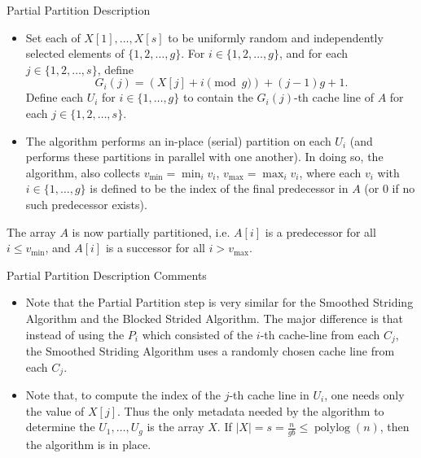 \documentclass{beamer}
\begin{document}
\begin{frame}[t]{Partial Partition Description}
	\begin{itemize}
\item Set each of $X[1], \ldots, X[s]$ to be uniformly random and
  independently selected elements of $\{1, 2, \ldots, g\}$. For
  $i \in \{1, 2, \ldots, g\}$, and for each $j \in \{1, 2,
  \ldots, s\}$, define
  $$G_i(j) = (X[j] + i \pmod g) + (j - 1)g + 1.$$ 
	Define each $U_i$ for $i \in \{1, \ldots, g\}$ to contain the $G_i(j)$-th cache line of $A$ for each $j \in \{1, 2,
  \ldots, s\}$. 

\item The algorithm performs an in-place (serial) partition on each
  $U_i$ (and performs these partitions in parallel with one
  another). In doing so, the algorithm, also collects
  $v_{\text{min}}=\min_i{v_i}$, $v_{\text{max}}=\max_i{v_i}$, where
	each $v_i$ with $i \in \{1, \ldots, g\}$ is defined to be the index
  of the final predecessor in $A$ (or $0$ if no such predecessor
  exists).
\end{itemize}
The array $A$ is now partially partitioned, i.e. $A[i]$ is a predecessor for all $i \le v_{\text{min}}$, and $A[i]$ is a successor for all $i > v_{\text{max}}$.

\end{frame}

\begin{frame}[t]{Partial Partition Description Comments}
	\begin{itemize}
		\item Note that the Partial Partition step is very similar for the Smoothed Striding Algorithm and the Blocked Strided Algorithm. The major difference is that instead of using the $P_i$ which consisted of the $i$-th cache-line from each $C_j$, the Smoothed Striding Algorithm uses a randomly chosen cache line from each $C_j$.
		\item Note that, to compute the index of the $j$-th cache line in $U_i$, one needs only the value of $X[j]$. Thus the only metadata needed by the algorithm to determine the $U_1, \ldots, U_g$ is the array $X$. If $|X| = s = \frac{n}{gb} \le \operatorname{polylog}(n)$, then the algorithm is in place.
	\end{itemize}	
\end{frame}
\end{document}
